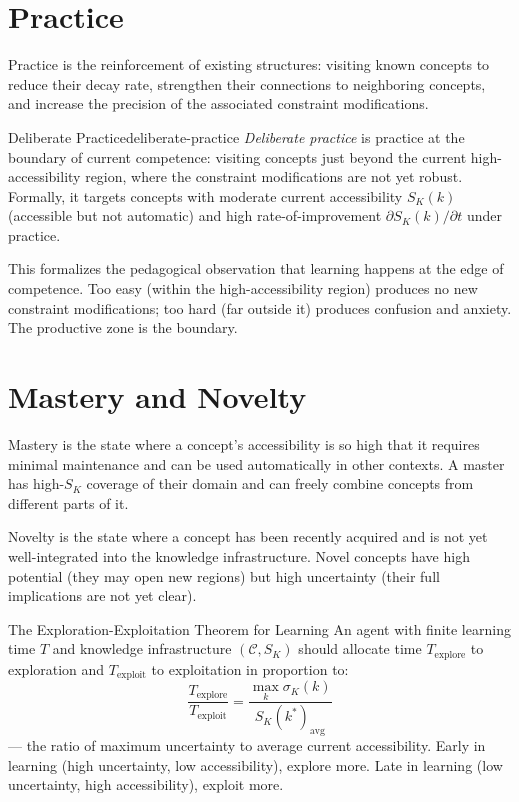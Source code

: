 \section{Practice}

Practice is the reinforcement of existing structures: visiting known
concepts to reduce their decay rate, strengthen their connections to
neighboring concepts, and increase the precision of the associated
constraint modifications.

\begin{definition}{Deliberate Practice}{deliberate-practice}
  \emph{Deliberate practice} is practice at the boundary of current
  competence: visiting concepts just beyond the current high-accessibility
  region, where the constraint modifications are not yet robust.
  Formally, it targets concepts with moderate current accessibility
  $S_K(k)$ (accessible but not automatic) and high rate-of-improvement
  $\partial S_K(k)/\partial t$ under practice.
\end{definition}

This formalizes the pedagogical observation that learning happens at
the edge of competence. Too easy (within the high-accessibility region)
produces no new constraint modifications; too hard (far outside it)
produces confusion and anxiety. The productive zone is the boundary.

\section{Mastery and Novelty}

Mastery is the state where a concept's accessibility is so high that
it requires minimal maintenance and can be used automatically in other
contexts. A master has high-$S_K$ coverage of their domain and can
freely combine concepts from different parts of it.

Novelty is the state where a concept has been recently acquired and is
not yet well-integrated into the knowledge infrastructure. Novel concepts
have high potential (they may open new regions) but high uncertainty
(their full implications are not yet clear).

\begin{namedthm}{The Exploration-Exploitation Theorem for Learning}
  An agent with finite learning time $T$ and knowledge infrastructure
  $(\mathcal{C}, S_K)$ should allocate time $T_\text{explore}$ to
  exploration and $T_\text{exploit}$ to exploitation in proportion to:
  \[
    \frac{T_\text{explore}}{T_\text{exploit}} =
    \frac{\max_k \sigma_K(k)}{S_K(k^*)_\text{avg}}
  \]
  — the ratio of maximum uncertainty to average current accessibility.
  Early in learning (high uncertainty, low accessibility), explore more.
  Late in learning (low uncertainty, high accessibility), exploit more.
\end{namedthm}

